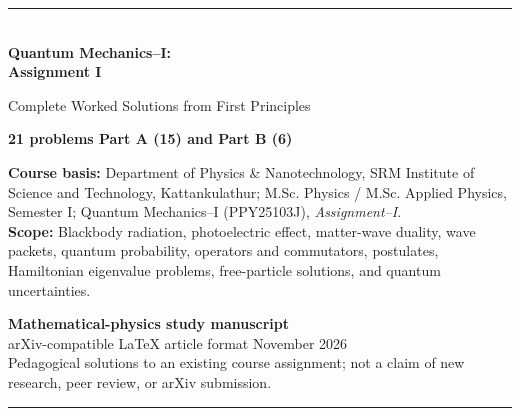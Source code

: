 \documentclass[11pt,a4paper]{article}
\newcommand{\Sch}{Schr\"odinger}
\begin{document}
\begin{titlepage}
\thispagestyle{empty}
\vspace*{21mm}
{\color{teal}\rule{\textwidth}{1.4pt}}\\[11mm]
{\sffamily\fontsize{27}{31}\selectfont\bfseries Quantum Mechanics--I:\\[2mm] Assignment I}\par
\vspace{5mm}
{\sffamily\Large Complete Worked Solutions from First Principles}\par
\vspace{12mm}
{\large\textbf{21 problems \textbullet{} Part A (15) and Part B (6)}}\par
\vspace{8mm}
\begin{tcolorbox}[colback=pale,colframe=teal]
\textbf{Course basis:} Department of Physics \& Nanotechnology, SRM Institute of Science and Technology, Kattankulathur; M.Sc. Physics / M.Sc. Applied Physics, Semester I; Quantum Mechanics--I (PPY25103J), \emph{Assignment--I}.\\[4pt]
\textbf{Scope:} Blackbody radiation, photoelectric effect, matter-wave duality, wave packets, quantum probability, operators and commutators, postulates, Hamiltonian eigenvalue problems, free-particle solutions, and quantum uncertainties.
\end{tcolorbox}
\vfill
{\large\textbf{Mathematical-physics study manuscript}}\\[5pt]
{\normalsize arXiv-compatible \LaTeX{} article format \textbullet{} November 2026}\\[7pt]
{\small\color{ink}Pedagogical solutions to an existing course assignment; not a claim of new research, peer review, or arXiv submission.}\par
\vspace{8mm}
{\color{teal}\rule{\textwidth}{1.4pt}}
\end{titlepage}

\begin{abstract}
This self-contained teaching manuscript develops detailed solutions to all fifteen short questions and six extended questions in Quantum Mechanics--I, Assignment I, for first-semester M.Sc. students. The presentation begins with blackbody radiation and experimental foundations of wave--particle duality, then develops the Hilbert-space description of quantum states, the properties of unbounded differential operators, canonical commutation, and the \Sch{} equation. Special attention is given to mathematical subtleties frequently obscured in elementary treatments: frequency-versus-wavelength spectral densities, the energy convention behind matter-wave phase velocity, the distinction between symmetric and self-adjoint operators, generalized momentum eigenfunctions versus normalizable wave packets, and the interpretation of uncertainties for discontinuous states. Derivations are presented step by step with physical interpretation and concise boxed results. The text is intended for study and examination preparation, not as an original research article.
\end{abstract}
\tableofcontents
\clearpage
\end{document}
